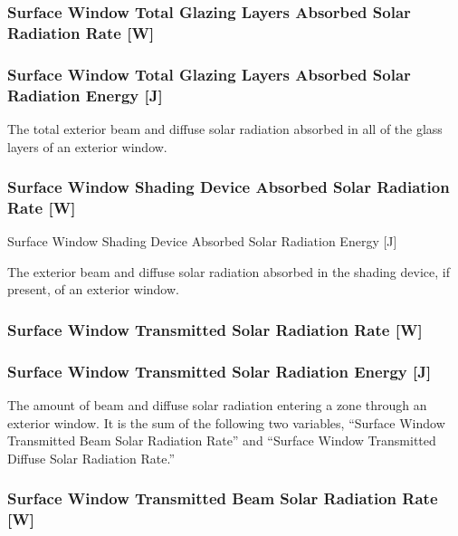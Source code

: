 \subsubsection{Surface Window Total Glazing Layers Absorbed Solar Radiation Rate {[}W{]}}\label{surface-window-total-glazing-layers-absorbed-solar-radiation-rate-w}

\subsubsection{Surface Window Total Glazing Layers Absorbed Solar Radiation Energy {[}J{]}}\label{surface-window-total-glazing-layers-absorbed-solar-radiation-energy-j}

The total exterior beam and diffuse solar radiation absorbed in all of the glass layers of an exterior window.

\subsubsection{Surface Window Shading Device Absorbed Solar Radiation Rate {[}W{]}}\label{surface-window-shading-device-absorbed-solar-radiation-rate-w}

Surface Window Shading Device Absorbed Solar Radiation Energy {[}J{]}

The exterior beam and diffuse solar radiation absorbed in the shading device, if present, of an exterior window.

\subsubsection{Surface Window Transmitted Solar Radiation Rate {[}W{]}}\label{surface-window-transmitted-solar-radiation-rate-w}

\subsubsection{Surface Window Transmitted Solar Radiation Energy {[}J{]}}\label{surface-window-transmitted-solar-radiation-energy-j}

The amount of beam and diffuse solar radiation entering a zone through an exterior window. It is the sum of the following two variables, ``Surface Window Transmitted Beam Solar Radiation Rate'' and ``Surface Window Transmitted Diffuse Solar Radiation Rate.''

\subsubsection{Surface Window Transmitted Beam Solar Radiation Rate {[}W{]}}\label{surface-window-transmitted-beam-solar-radiation-rate-w}

